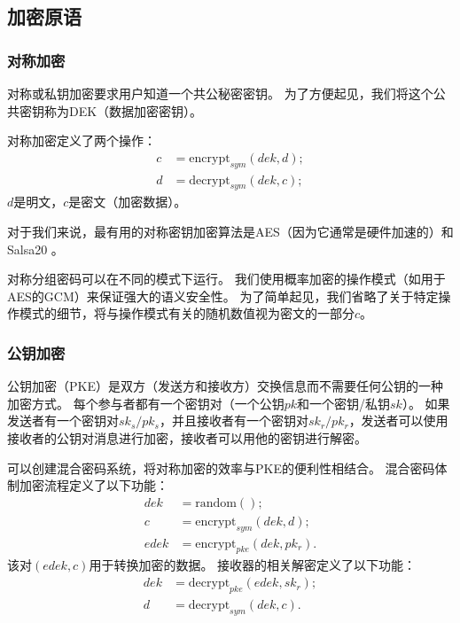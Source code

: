\documentclass[longbibliography,nofootinbib]{revtex4-1}
\begin{document}
\subsection{加密原语}

\subsubsection{对称加密}

对称或私钥加密要求用户知道一个共公秘密密钥。
为了方便起见，我们将这个公共密钥称为DEK（数据加密密钥）。

对称加密定义了两个操作：
\begin{align}
    c &= \text{encrypt}_{sym}(dek, d);\\
    d &= \text{decrypt}_{sym}(dek, c);
\end{align}
$d$是明文，$c$是密文（加密数据）。

对于我们来说，最有用的对称密钥加密算法是AES（因为它通常是硬件加速的）\cite{wiki:aes}和Salsa20 \cite{wiki:salsa20}。

对称分组密码可以在不同的模式下运行。
我们使用概率加密的操作模式（如用于AES的GCM）来保证强大的语义安全性。
为了简单起见，我们省略了关于特定操作模式的细节，将与操作模式有关的随机数值视为密文的一部分$c$。

\subsubsection{公钥加密}

公钥加密（PKE）是双方（发送方和接收方）交换信息而不需要任何公钥的一种加密方式。
每个参与者都有一个密钥对（一个公钥$pk$和一个密钥/私钥$sk$）。
如果发送者有一个密钥对$sk_s/pk_s$，并且接收者有一个密钥对$sk_r/pk_r$，发送者可以使用接收者的公钥对消息进行加密，接收者可以用他的密钥进行解密。

可以创建混合密码系统，将对称加密的效率与PKE的便利性相结合。
混合密码体制加密流程定义了以下功能：
\begin{align}
    dek &= \text{random}();\\
    c &= \text{encrypt}_{sym}(dek, d);\\
    edek &= \text{encrypt}_{pke}(dek, pk_r).
\end{align}
该对$(edek,c)$用于转换加密的数据。
接收器的相关解密定义了以下功能：
\begin{align}
    dek &= \text{decrypt}_{pke}(edek, sk_r);\\
    d &= \text{decrypt}_{sym}(dek, c).
\end{align}
\end{document}
